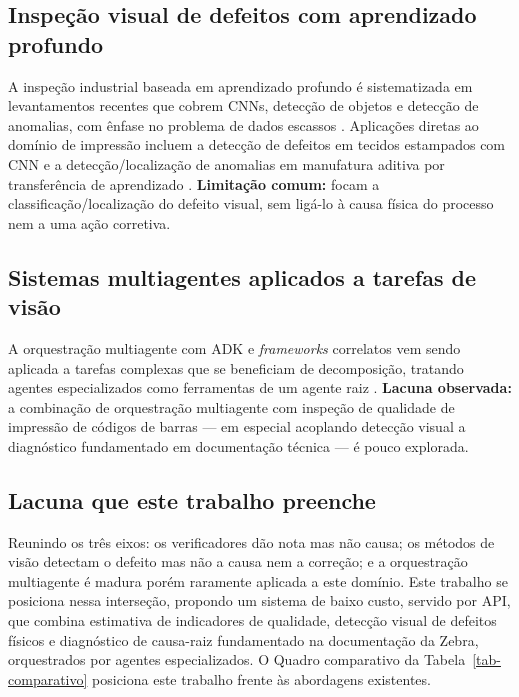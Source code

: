 \documentclass[
	article,			%
	11pt,				%
	oneside,			%
	a4paper,			%
	english,			%
	brazilian,			%
	sumario=tradicional
	]{abntex2}
\begin{document}
\subsection{Inspeção visual de defeitos com aprendizado profundo}

A inspeção industrial baseada em aprendizado profundo é sistematizada em
levantamentos recentes que cobrem CNNs, detecção de objetos e detecção de
anomalias, com ênfase no problema de dados escassos
\cite{frontiers2025anomaly,survey2022unsupervised}. Aplicações diretas ao domínio
de impressão incluem a detecção de defeitos em tecidos estampados com CNN
\cite{fabric2021cnn} e a detecção/localização de anomalias em manufatura aditiva
por transferência de aprendizado \cite{fff2024thermal}. \textbf{Limitação comum:}
focam a classificação/localização do defeito visual, sem ligá-lo à causa física
do processo nem a uma ação corretiva.

\subsection{Sistemas multiagentes aplicados a tarefas de visão}

A orquestração multiagente com ADK e \textit{frameworks} correlatos vem sendo
aplicada a tarefas complexas que se beneficiam de decomposição, tratando agentes
especializados como ferramentas de um agente raiz \cite{google_adk_blog}.
\textbf{Lacuna observada:} a combinação de orquestração multiagente com inspeção
de qualidade de impressão de códigos de barras --- em especial acoplando detecção
visual a diagnóstico fundamentado em documentação técnica --- é pouco explorada.

\subsection{Lacuna que este trabalho preenche}

Reunindo os três eixos: os verificadores dão nota mas não causa; os métodos de
visão detectam o defeito mas não a causa nem a correção; e a orquestração
multiagente é madura porém raramente aplicada a este domínio. Este trabalho se
posiciona nessa interseção, propondo um sistema de baixo custo, servido por API,
que combina estimativa de indicadores de qualidade, detecção visual de defeitos
físicos e diagnóstico de causa-raiz fundamentado na documentação da Zebra,
orquestrados por agentes especializados. O Quadro comparativo da
Tabela~\ref{tab-comparativo} posiciona este trabalho frente às abordagens
existentes.
\end{document}
